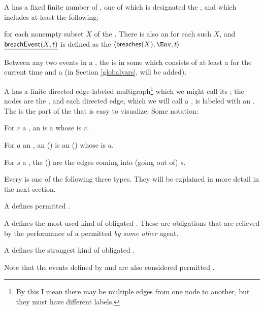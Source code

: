 \documentclass[12pt]{article}
\begin{document}
A \Contract has a fixed finite number of , one of which is designated the , and which includes at least the following:
\begin{LPPI}
\item {}
\item {} for each nonempty subset $X$ of the \Roles. There is also an \Action {} for each such $X$, and $\underline{\textsf{breachEvent}(X,t)}$ is defined as the \Event $\tup{\breaches{X}, \Env, t}$
\end{LPPI}
Between any two events in a \trace, the \Contract is in some  which consists of at least a \TimeStamp for the current time and a \State (in Section \ref{globalvars}, \GVars will be added).

\medskip

A \Contract has a finite directed edge-labeled multigraph\footnote{By this I mean there may be multiple edges from one node to another, but they must have different labels.} which we might call its ; the nodes are the \States, and each directed edge, which we will call a , is labeled with an \Action. The \skeleton is the part of the \Contract that is easy to visualize. Some notation:
\begin{LPPI}
\item For $r$ a \Role, an  is a \transition whose \Role is $r$.
\item For $a$ an \Action, an  () is an \Event (\transition) whose \Action is $a$.
\item For $s$ a \State, the  () are the edges coming into (going out of) $s$.
\end{LPPI}
Every \transition is one of the following three types. They will be explained in more detail in the next section.
\begin{LPPI}
\item A  defines permitted \Events.
\item A  defines the most-used kind of obligated \Events. These are obligations that are relieved by the performance of a permitted {\Event} {\it by some other} agent.
\item A  defines the strongest kind of obligated \Events.
\end{LPPI}
Note that the events defined by \rmustntrans and \mustntrans are also considered permitted \Events.
\end{document}
